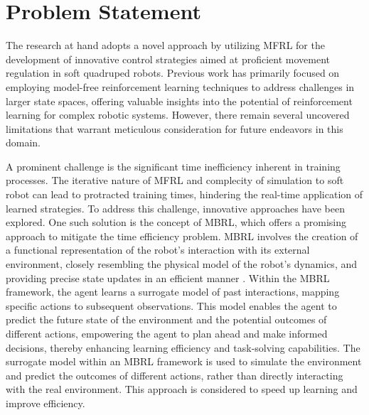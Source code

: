 \section{Problem Statement}
The research at hand adopts a novel approach by utilizing \ac{MFRL} for the development of innovative control strategies aimed at proficient movement regulation in soft quadruped robots\cite{ji2022Synthesizing}. Previous work has primarily focused on employing model-free reinforcement learning techniques to address challenges in larger state spaces, offering valuable insights into the potential of reinforcement learning for complex robotic systems. However, there remain several uncovered limitations that warrant meticulous consideration for future endeavors in this domain.

A prominent challenge is the significant time inefficiency inherent in training processes. The iterative nature of \ac{MFRL} and complecity of simulation to soft robot can lead to protracted training times, hindering the real-time application of learned strategies\cite{ji2022Synthesizing}. To address this challenge, innovative approaches have been explored. One such solution is the concept of \ac{MBRL}, which offers a promising approach to mitigate the time efficiency problem. MBRL involves the creation of a functional representation of the robot's interaction with its external environment, closely resembling the physical model of the robot's dynamics, and providing precise state updates in an efficient manner \cite{ray2010ModelBased}. Within the MBRL framework, the agent learns a surrogate model of past interactions, mapping specific actions to subsequent observations. This model enables the agent to predict the future state of the environment and the potential outcomes of different actions, empowering the agent to plan ahead and make informed decisions, thereby enhancing learning efficiency and task-solving capabilities\cite{polydoros2017Survey}. The surrogate model within an MBRL framework is used to simulate the environment and predict the outcomes of different actions, rather than directly interacting with the real
environment. This approach is considered to speed up learning and improve efficiency.

